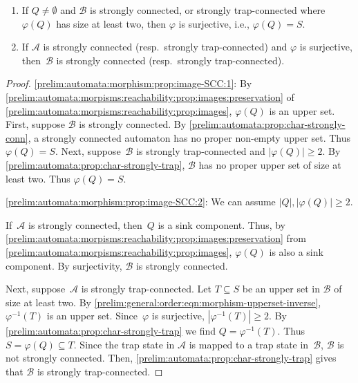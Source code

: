 \begin{proposition} \label{prelim:automata:morphism:prop:image-SCC}
\begin{enumerate}
\item \label{prelim:automata:morphism:prop:image-SCC:1} If $Q \ne \emptyset$ and $\mathcal B$ is strongly connected, or strongly trap-connected where $\varphi(Q)$ has size at least two,
then $\varphi$ is surjective, i.e., $\varphi(Q) = S$.

\item \label{prelim:automata:morphism:prop:image-SCC:2} If $\mathcal A$ is strongly connected (resp.~strongly trap-connected)
and $\varphi$ is surjective, 
then~$\mathcal B$ is strongly connected (resp.~strongly trap-connected). 
\end{enumerate}
\end{proposition}
\begin{proof}
\ref{prelim:automata:morphism:prop:image-SCC:1}: By \cref{prelim:automata:morpisms:reachability:prop:images:preservation} of \cref{prelim:automata:morpisms:reachability:prop:images}, $\varphi(Q)$ is an upper set.
 First, suppose $\mathcal B$ is strongly connected.
 By \cref{prelim:automata:prop:char-strongly-conn}, a strongly connected automaton has no proper non-empty upper
 set. Thus $\varphi(Q) = S$.
 Next, suppose~$\mathcal B$ is strongly trap-connected and $|\varphi(Q)| \ge 2$.
 By \cref{prelim:automata:prop:char-strongly-trap}, $\mathcal B$
 has no proper upper set of size at least two.
 Thus $\varphi(Q) = S$.

\ref{prelim:automata:morphism:prop:image-SCC:2}: We can assume $|Q|, |\varphi(Q)| \ge 2$.

If~$\mathcal A$ is strongly connected, then~$Q$ is a sink component.
Thus, by \cref{prelim:automata:morpisms:reachability:prop:images:preservation} from \cref{prelim:automata:morpisms:reachability:prop:images},
$\varphi(Q)$ is also a sink component. By surjectivity, $\mathcal B$ is strongly connected.

Next, suppose~$\mathcal A$ is strongly trap-connected.
Let $T \subseteq S$ be an upper set in $\mathcal B$
of size at least two.
By \cref{prelim:general:order:eqn:morphism-upperset-inverse}, $\varphi^{-1}(T)$
is an upper set. Since~$\varphi$ is surjective, $|\varphi^{-1}(T)| \ge 2$.
By \cref{prelim:automata:prop:char-strongly-trap} we find $Q = \varphi^{-1}(T)$.
Thus $S = \varphi(Q) \subseteq T$.
Since the trap state in $\mathcal A$ is mapped to a trap state in~$\mathcal B$,
$\mathcal B$ is not strongly connected.
Then, \cref{prelim:automata:prop:char-strongly-trap} gives
that $\mathcal B$ is strongly trap-connected.
\end{proof}

